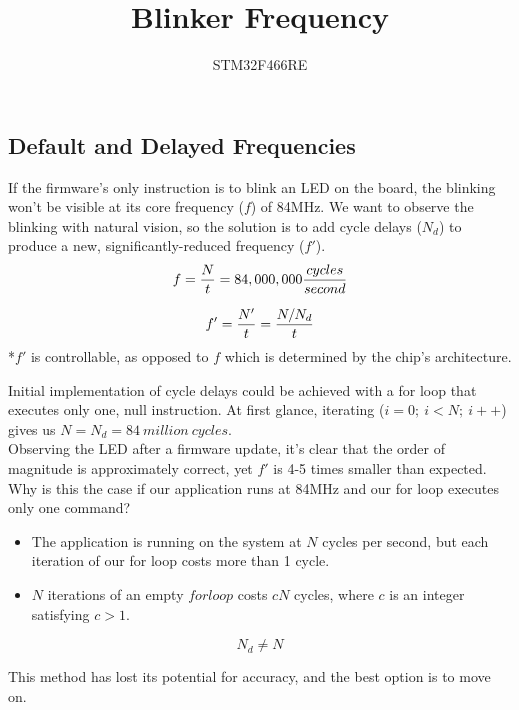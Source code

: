 \documentclass[a4paper,12pt]{article}   	%
\title{Blinker Frequency}
\author{STM32F466RE}
\begin{document}
\maketitle

\subsection*{Default and Delayed Frequencies}
\large
If the firmware's only instruction is to blink an LED on the board,
the blinking won't be visible at its core 
frequency ($f$) of 84MHz. We want to observe the blinking 
with natural vision, so the solution 
is to add cycle delays ($N_d$) to produce a new, 
significantly-reduced frequency ($f'$).\\[1 ex]

$$f = \frac{N}{t} = 84,000,000 \frac{cycles}{second}\\[3 ex]$$

$$f' = \frac{N'}{t} = \frac{N/N_d}{t}\\[3 ex]$$
\large
\normalsize
*$f'$ is controllable, as opposed to $f$ which is determined by the chip's architecture.\\[1 ex]

\large
\begin{flushleft}
Initial implementation of cycle delays could be achieved
with a 
for loop that executes only one, null instruction. At first 
glance, iterating ($i = 0;\ i < N;\ i++$)
gives us $N = N_d = 84\ million\ cycles$.\\[1 ex]

Observing the LED after a firmware update, it's clear that the order of magnitude is approximately correct, 
yet $f'$ is 4-5 times smaller than expected. Why is this the case 
if our application runs at 84MHz and our for loop executes only one command?\\[1 ex]

\end{flushleft}
\begin{itemize}
\setlength{\itemindent}{0.4in}
    \item The application is running on the system at $N$ cycles per second, 
    but each iteration of our for loop 
    costs more than 1 cycle. 
    \item $N$ iterations of an empty $for loop$ costs $cN$ cycles, where $c$ is an integer satisfying $c > 1$.
\end{itemize}

$$N_d \neq N$$



\begin{flushleft}
    This method has lost its potential for accuracy, and the best option is to move on.

\end{flushleft}
\end{document}
